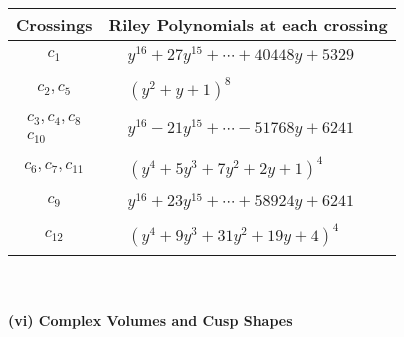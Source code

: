 \documentclass[1p]{elsarticle_modified}
\theoremstyle{definition}
\begin{document}
\begin{tabular}{m{50pt}|m{274pt}}
Crossings & \hspace{64pt}Riley Polynomials at each crossing \\
\hline $$\begin{aligned}c_{1}\end{aligned}$$&$\begin{aligned}
&y^{16}+27 y^{15}+\cdots+40448 y+5329
\end{aligned}$\\
\hline $$\begin{aligned}c_{2},c_{5}\end{aligned}$$&$\begin{aligned}
&(y^2+y+1)^8
\end{aligned}$\\
\hline $$\begin{aligned}c_{3},c_{4},c_{8}\\c_{10}\end{aligned}$$&$\begin{aligned}
&y^{16}-21 y^{15}+\cdots-51768 y+6241
\end{aligned}$\\
\hline $$\begin{aligned}c_{6},c_{7},c_{11}\end{aligned}$$&$\begin{aligned}
&(y^4+5 y^3+7 y^2+2 y+1)^4
\end{aligned}$\\
\hline $$\begin{aligned}c_{9}\end{aligned}$$&$\begin{aligned}
&y^{16}+23 y^{15}+\cdots+58924 y+6241
\end{aligned}$\\
\hline $$\begin{aligned}c_{12}\end{aligned}$$&$\begin{aligned}
&(y^4+9 y^3+31 y^2+19 y+4)^4
\end{aligned}$\\
\hline
\end{tabular}\\~\\
\newpage\flushleft \textbf{(vi) Complex Volumes and Cusp Shapes}
\end{document}
